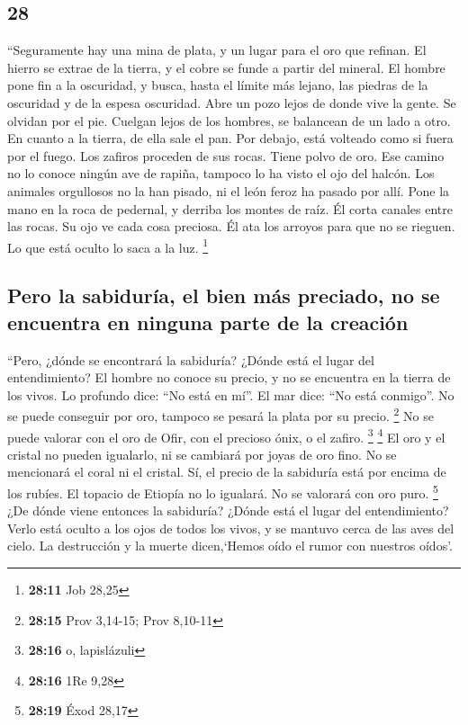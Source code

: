 \begin{paracol}{2}
\hypertarget{section-54}{%
\section{28}\label{section-54}}

 ``Seguramente hay una mina de plata, y un lugar para el
oro que refinan.  El hierro se extrae de la tierra, y el
cobre se funde a partir del mineral.  El hombre pone fin a
la oscuridad, y busca, hasta el límite más lejano, las piedras de la
oscuridad y de la espesa oscuridad.  Abre un pozo lejos de
donde vive la gente. Se olvidan por el pie. Cuelgan lejos de los
hombres, se balancean de un lado a otro.  En cuanto a la
tierra, de ella sale el pan. Por debajo, está volteado como si fuera por
el fuego.  Los zafiros proceden de sus rocas. Tiene polvo
de oro.  Ese camino no lo conoce ningún ave de rapiña,
tampoco lo ha visto el ojo del halcón.  Los animales
orgullosos no la han pisado, ni el león feroz ha pasado por allí.
 Pone la mano en la roca de pedernal, y derriba los montes
de raíz.  Él corta canales entre las rocas. Su ojo ve
cada cosa preciosa.  Él ata los arroyos para que no se
rieguen. Lo que está oculto lo saca a la luz. \footnote{\textbf{28:11}
  Job 28,25}

\hypertarget{pero-la-sabiduruxeda-el-bien-muxe1s-preciado-no-se-encuentra-en-ninguna-parte-de-la-creaciuxf3n}{%
\subsection{Pero la sabiduría, el bien más preciado, no se encuentra en
ninguna parte de la
creación}\label{pero-la-sabiduruxeda-el-bien-muxe1s-preciado-no-se-encuentra-en-ninguna-parte-de-la-creaciuxf3n}}

 ``Pero, ¿dónde se encontrará la sabiduría? ¿Dónde está
el lugar del entendimiento?  El hombre no conoce su
precio, y no se encuentra en la tierra de los vivos.  Lo
profundo dice: ``No está en mí''. El mar dice: ``No está conmigo''.
 No se puede conseguir por oro, tampoco se pesará la
plata por su precio. \footnote{\textbf{28:15} Prov 3,14-15; Prov 8,10-11}
 No se puede valorar con el oro de Ofir, con el precioso
ónix, o el zafiro. \footnote{\textbf{28:16} o, lapislázuli} \footnote{\textbf{28:16}
  1Re 9,28}  El oro y el cristal no pueden igualarlo, ni
se cambiará por joyas de oro fino.  No se mencionará el
coral ni el cristal. Sí, el precio de la sabiduría está por encima de
los rubíes.  El topacio de Etiopía no lo igualará. No se
valorará con oro puro. \footnote{\textbf{28:19} Éxod 28,17}
 ¿De dónde viene entonces la sabiduría? ¿Dónde está el
lugar del entendimiento?  Verlo está oculto a los ojos de
todos los vivos, y se mantuvo cerca de las aves del cielo.
 La destrucción y la muerte dicen,`Hemos oído el rumor
con nuestros oídos'.


\end{paracol}
